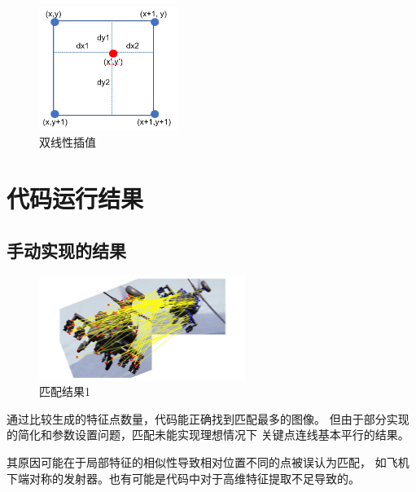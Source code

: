 \documentclass{article}
\begin{document}
\begin{figure}[h]
\centering
\includegraphics[width=0.4\textwidth]{./others/2}
\caption{双线性插值}
\end{figure}

\section{代码运行结果}

\subsection{手动实现的结果}

\begin{figure}[h]
\centering
\includegraphics[width=0.6\textwidth]{./result/3}
\caption{匹配结果1}
\end{figure}

    通过比较生成的特征点数量，代码能正确找到匹配最多的图像。
    但由于部分实现的简化和参数设置问题，匹配未能实现理想情况下
    关键点连线基本平行的结果。

    其原因可能在于局部特征的相似性导致相对位置不同的点被误认为匹配，
    如飞机下端对称的发射器。也有可能是代码中对于高维特征提取不足导致的。
\end{document}

